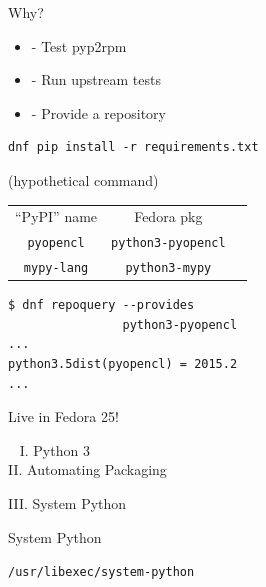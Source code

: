 \documentclass[1610,20pt]{beamer}
\newcommand\sk{\par\bigskip\bigskip\par}
\begin{document}
\begin{center}
\begin{frame}[fragile]
    \sk\pause
    {\color{mutegray} Why?}
    \begin{itemize}
    \pause
    \item{-} Test pyp2rpm
    \pause
    \item{-} Run upstream tests
    \pause
    \item{-} Provide a repository
    \end{itemize}
\end{frame}

\begin{frame}[fragile]
    \begin{lstlisting}[frame=single]
dnf pip install -r requirements.txt
    \end{lstlisting}

    \sk

    \color{mutegray}(hypothetical command)
\end{frame}

\begin{frame}[fragile]
    \small
    \begin{tabular}{ccc}
    “PyPI” name & Fedora pkg \\
    \texttt{pyopencl} & \texttt{python3-pyopencl} \\
    \texttt{mypy-lang} & \texttt{python3-mypy} \\
    \end{tabular}

    \sk\pause

    \begin{lstlisting}[frame=single]
$ dnf repoquery --provides
                python3-pyopencl
...
python3.5dist(pyopencl) = 2015.2
...
    \end{lstlisting}

    \pause
    Live in Fedora 25!
\end{frame}

{
\begin{frame}[fragile]~
    {\color{mutegray} I. Python 3} \\
    {\color{mutegray} II. Automating Packaging} \\

    \sk\color{white}

    \huge
    III. System Python
\end{frame}
}

\begin{frame}[fragile]
    System Python

    \sk

    \texttt{/usr/libexec/system-python}


\end{frame}
\end{center}
\end{document}

